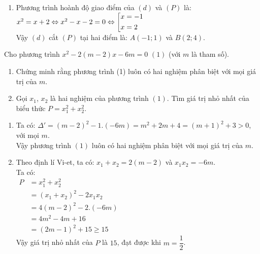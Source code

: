 \begin{ex}
{\begin{enumerate}
\begin{center}
        		\end{center}        		
        \item Phương trình hoành độ giao điểm của $(d)$ và $(P)$ là:\\
        		\hspace*{1cm} $x^2=x+2 \Leftrightarrow x^2-x-2=0 \Leftrightarrow \left[\begin{aligned}x&=-1 \\ x&=2\end{aligned}\right.$\\
       			Vậy $(d)$ cắt $(P)$ tại hai điểm là: $A(-1; 1)$ và $B(2; 4)$.
    \end{enumerate}
    }
\end{ex}

\begin{ex}%
    Cho phương trình $x^2-2(m-2)x-6m=0$ $(1)$ (với $m$ là tham số).
    \begin{enumerate}
        \item Chứng minh rằng phương trình (1) luôn có hai nghiệm phân biệt với mọi giá trị của $m$.
        \item Gọi $x_1$, $x_2$ là hai nghiệm của phương trình $(1)$. Tìm giá trị nhỏ nhất của biểu thức $P=x_1^2 + x_2^2$.
    \end{enumerate}
\loigiai
    {
    \begin{enumerate}
        \item Ta có: $\Delta '=(m-2)^2-1.(-6m)=m^2+2m+4=(m+1)^2+3>0$, với mọi $m$.\\
        		Vậy phương trình $(1)$ luôn có hai nghiệm phân biệt với mọi giá trị của $m$.
        \item Theo định lí Vi-et, ta có: $x_1+x_2=2(m-2)$ và $x_1 x_2=-6m$.\\
        		Ta có:\\
        		 $
       			 \begin{aligned}
       				 P&=x_1^2 + x_2^2\\
        			&=\left(x_1 + x_2\right)^2-2x_1x_2\\ 
        			&=4(m-2)^2-2.(-6m)\\
        			&=4m^2-4m+16\\
        			&=(2m-1)^2+15\geq 15
        		\end{aligned}
        		$\\
        		Vậy giá trị nhỏ nhất của $P$ là $15$, đạt được khi $m=\dfrac{1}{2}$.
    \end{enumerate}
    }
\end{ex}

